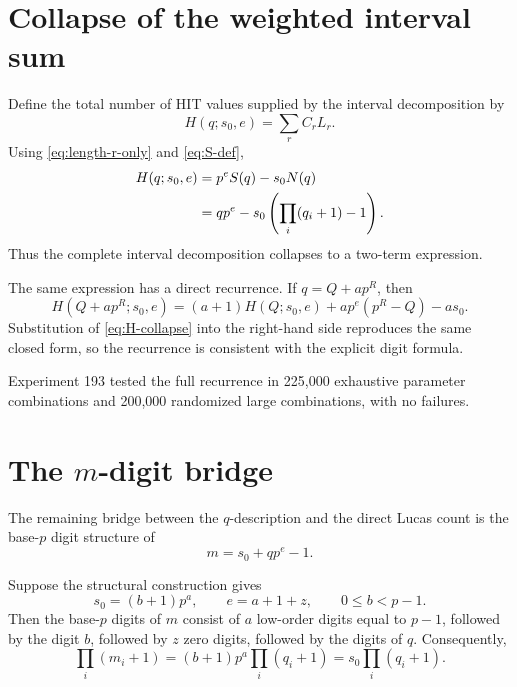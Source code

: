 \documentclass[11pt,a4paper]{article}
\theoremstyle{definition}
\theoremstyle{remark}
\begin{document}
\section{Collapse of the weighted interval sum}

Define the total number of HIT values supplied by the interval decomposition by
\begin{equation}
 H(q;s_0,e)=\sum_r C_rL_r.
 \label{eq:H-def}
\end{equation}
Using \eqref{eq:length-r-only} and \eqref{eq:S-def},
\begin{align}
 H(q;s_0,e)
 &=p^eS(q)-s_0N(q)\notag\\
 &=qp^e-s_0\left(\prod_i(q_i+1)-1\right).
 \label{eq:H-collapse}
\end{align}
Thus the complete interval decomposition collapses to a two-term expression.

The same expression has a direct recurrence. If $q=Q+ap^R$, then
\begin{equation}
\boxed{
 H(Q+ap^R;s_0,e)
 = (a+1)H(Q;s_0,e)
   +ap^e(p^R-Q)-as_0.
}
 \label{eq:H-recurrence}
\end{equation}
Substitution of \eqref{eq:H-collapse} into the right-hand side reproduces the same closed form, so the recurrence is consistent with the explicit digit formula.

Experiment 193 tested the full recurrence in 225,000 exhaustive parameter combinations and 200,000 randomized large combinations, with no failures.

\section{The $m$-digit bridge}

The remaining bridge between the $q$-description and the direct Lucas count is the base-$p$ digit structure of
\begin{equation}
 m=s_0+qp^e-1.
 \label{eq:bridge-input}
\end{equation}

Suppose the structural construction gives
\begin{equation}
 s_0=(b+1)p^a,
 \qquad
 e=a+1+z,
 \qquad 0\le b<p-1.
 \label{eq:s0-structure}
\end{equation}
Then the base-$p$ digits of $m$ consist of $a$ low-order digits equal to $p-1$, followed by the digit $b$, followed by $z$ zero digits, followed by the digits of $q$. Consequently,
\begin{equation}
 \prod_i(m_i+1)
 = (b+1)p^a\prod_i(q_i+1)
 =s_0\prod_i(q_i+1).
 \label{eq:m-q-product}
\end{equation}
\end{document}
